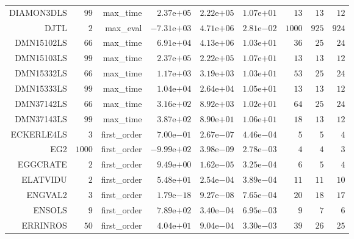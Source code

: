 \begin{longtable}{rrrrrrrrr}
DIAMON3DLS & \(    99\) & max\_time & \( 2.37\)e\(+05\) & \( 2.22\)e\(+05\) & \( 1.07\)e\(+01\) & \(    13\) & \(    13\) & \(    12\) \\
DJTL & \(     2\) & max\_eval & \(-7.31\)e\(+03\) & \( 4.71\)e\(+06\) & \( 2.81\)e\(-02\) & \(  1000\) & \(   925\) & \(   924\) \\
DMN15102LS & \(    66\) & max\_time & \( 6.91\)e\(+04\) & \( 4.13\)e\(+06\) & \( 1.03\)e\(+01\) & \(    36\) & \(    25\) & \(    24\) \\
DMN15103LS & \(    99\) & max\_time & \( 2.37\)e\(+05\) & \( 2.22\)e\(+05\) & \( 1.07\)e\(+01\) & \(    13\) & \(    13\) & \(    12\) \\
DMN15332LS & \(    66\) & max\_time & \( 1.17\)e\(+03\) & \( 3.19\)e\(+03\) & \( 1.03\)e\(+01\) & \(    53\) & \(    25\) & \(    24\) \\
DMN15333LS & \(    99\) & max\_time & \( 1.04\)e\(+04\) & \( 2.64\)e\(+04\) & \( 1.05\)e\(+01\) & \(    13\) & \(    13\) & \(    12\) \\
DMN37142LS & \(    66\) & max\_time & \( 3.16\)e\(+02\) & \( 8.92\)e\(+03\) & \( 1.02\)e\(+01\) & \(    64\) & \(    25\) & \(    24\) \\
DMN37143LS & \(    99\) & max\_time & \( 3.87\)e\(+02\) & \( 8.90\)e\(+01\) & \( 1.06\)e\(+01\) & \(    18\) & \(    13\) & \(    12\) \\
ECKERLE4LS & \(     3\) & first\_order & \( 7.00\)e\(-01\) & \( 2.67\)e\(-07\) & \( 4.46\)e\(-04\) & \(     5\) & \(     5\) & \(     4\) \\
EG2 & \(  1000\) & first\_order & \(-9.99\)e\(+02\) & \( 3.98\)e\(-09\) & \( 2.78\)e\(-03\) & \(     4\) & \(     4\) & \(     3\) \\
EGGCRATE & \(     2\) & first\_order & \( 9.49\)e\(+00\) & \( 1.62\)e\(-05\) & \( 3.25\)e\(-04\) & \(     6\) & \(     5\) & \(     4\) \\
ELATVIDU & \(     2\) & first\_order & \( 5.48\)e\(+01\) & \( 2.54\)e\(-04\) & \( 3.89\)e\(-04\) & \(    11\) & \(    11\) & \(    10\) \\
ENGVAL2 & \(     3\) & first\_order & \( 1.79\)e\(-18\) & \( 9.27\)e\(-08\) & \( 7.65\)e\(-04\) & \(    20\) & \(    18\) & \(    17\) \\
ENSOLS & \(     9\) & first\_order & \( 7.89\)e\(+02\) & \( 3.40\)e\(-04\) & \( 6.95\)e\(-03\) & \(     9\) & \(     7\) & \(     6\) \\
ERRINROS & \(    50\) & first\_order & \( 4.04\)e\(+01\) & \( 9.04\)e\(-04\) & \( 3.30\)e\(-03\) & \(    39\) & \(    26\) & \(    25\) \\

\end{longtable}
